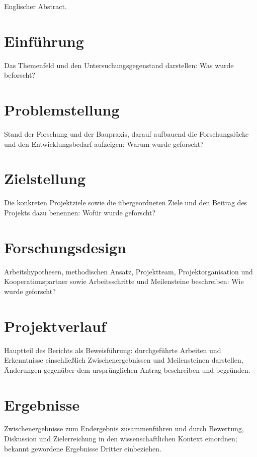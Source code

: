 \documentclass[type=forschungsbericht]{zukunftbau}
\begin{document}
Englischer Abstract.

\chapter{Einführung}
\label{kapitel:einfuehrung}
Das Themenfeld und den Untersuchungsgegenstand darstellen: Was wurde beforscht?

\chapter{Problemstellung}
\label{kapitel:problemstellung}
Stand der Forschung und der Baupraxis, darauf aufbauend die Forschungslücke und den Entwicklungsbedarf aufzeigen: Warum wurde geforscht?

\chapter{Zielstellung}
\label{kapitel:zielstellung}
Die konkreten Projektziele sowie die übergeordneten Ziele und den Beitrag des Projekts dazu benennen: Wofür wurde geforscht?

\chapter{Forschungsdesign}
\label{kapitel:forschungsdesign}
Arbeitshypothesen, methodischen Ansatz, Projektteam, Projektorganisation und Kooperationspartner sowie Arbeitsschritte und Meilensteine beschreiben: Wie wurde geforscht?


\chapter{Projektverlauf}
\label{kapitel:projektverlauf}
Hauptteil des Berichts als Beweisführung: durchgeführte Arbeiten und Erkenntnisse einschließlich Zwischenergebnissen und Meilensteinen darstellen, Änderungen gegenüber dem ursprünglichen Antrag beschreiben und begründen.

\chapter{Ergebnisse}
\label{kapitel:ergebnisse}
Zwischenergebnisse zum Endergebnis zusammenführen und durch Bewertung, Diskussion und Zielerreichung in den wissenschaftlichen Kontext einordnen; bekannt gewordene Ergebnisse Dritter einbeziehen.
\end{document}
